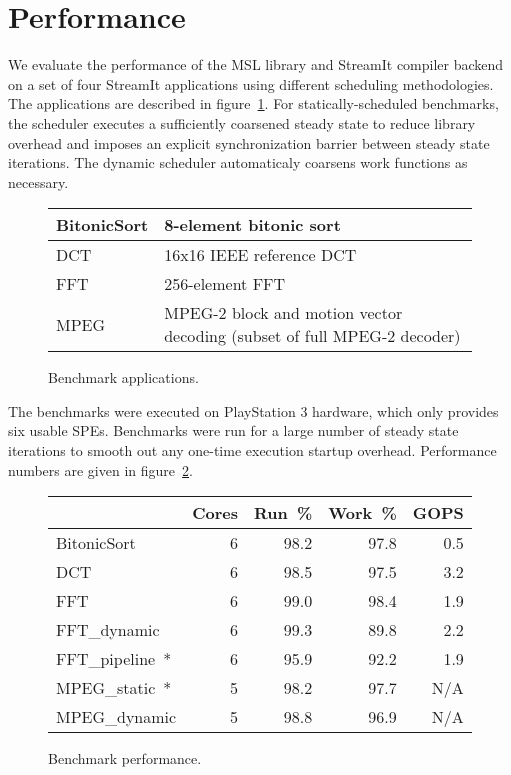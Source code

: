\section{Performance}\label{ch:perf}

We evaluate the performance of the MSL library and StreamIt compiler backend
on a set of four StreamIt applications using different scheduling
methodologies. The applications are described in figure~\ref{fig:perf:apps}.
For statically-scheduled benchmarks, the scheduler executes a sufficiently
coarsened steady state to reduce library overhead and imposes an explicit
synchronization barrier between steady state iterations. The dynamic scheduler
automaticaly coarsens work functions as necessary.

\begin{figure}[!htb]
\begin{center}
\begin{tabular}{|l|p{2.25in}|}
\hline
BitonicSort & 8-element bitonic sort \\
\hline
DCT & 16x16 IEEE reference DCT \\
\hline
FFT & 256-element FFT \\
\hline
MPEG & MPEG-2 block and motion vector decoding (subset of full MPEG-2 decoder) \\
\hline
\end{tabular}
\end{center}
\caption{Benchmark applications.}
\label{fig:perf:apps}
\end{figure}

The benchmarks were executed on PlayStation 3 hardware, which only provides
six usable SPEs. Benchmarks were run for a large number of steady state
iterations to smooth out any one-time execution startup overhead.
Performance numbers are given in figure~\ref{fig:perf:stats}.

\begin{figure}[!htb]
\begin{center}
\begin{tabular}{|l|r|r|r|r|}
\hline
& Cores & Run~\% & Work~\% & GOPS \\
\hline
\textsf{BitonicSort} & 6 & 98.2 & 97.8 & 0.5 \\
\hline
\textsf{DCT} & 6 & 98.5 & 97.5 & 3.2 \\
\hline
\textsf{FFT} & 6 & 99.0 & 98.4 & 1.9 \\
\hline
\textsf{FFT\_dynamic} & 6 & 99.3 & 89.8 & 2.2 \\
\hline
\textsf{FFT\_pipeline~*} & 6 & 95.9 & 92.2 & 1.9 \\
\hline
\textsf{MPEG\_static~*} & 5 & 98.2 & 97.7 & N/A \\
\hline
\textsf{MPEG\_dynamic} & 5 & 98.8 & 96.9 & N/A \\
\hline
\end{tabular}
\end{center}
\caption{Benchmark performance.}
\label{fig:perf:stats}
\end{figure}

